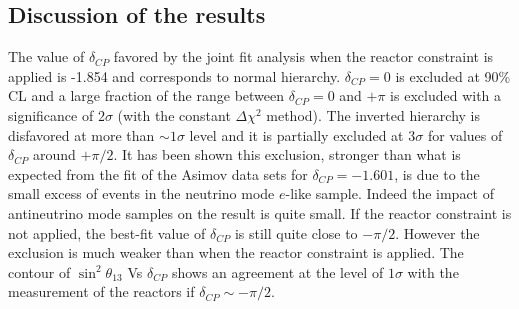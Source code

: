 
%



%
%

\subsection {Discussion of the results}
\label{sec:results_discussion}

The value of $\delta_{CP}$ favored by the joint fit analysis when the reactor constraint is applied 
is -1.854 and corresponds to normal hierarchy.
$\delta_{CP} = 0$ is excluded at 90\% CL and a large fraction of the range between $\delta_{CP} = 0$ and $+\pi$
is excluded with a significance of $2 \sigma$ (with the constant $\Delta \chi^2$ method).
The inverted hierarchy is disfavored at more than $\sim 1 \sigma$ level and it is partially 
excluded at $3\sigma$ for values of $\delta_{CP}$ around $+\pi/2$.
It has been shown this exclusion, stronger than what is expected from the fit of the Asimov data sets for $\delta_{CP}=-1.601$,
is due to the small excess of events in the neutrino mode $e$-like sample. 
Indeed the impact of antineutrino mode samples on the result is quite small.
If the reactor constraint is not applied, the best-fit value of $\delta_{CP}$ is still quite close to $-\pi/2$.
However the exclusion is much weaker than when the reactor constraint is applied.
The contour of $\sin^2 \theta_{13}$ Vs $\delta_{CP}$ shows
an agreement at the level of $1 \sigma$ with the measurement of the reactors if $\delta_{CP} \sim -\pi/2$.

